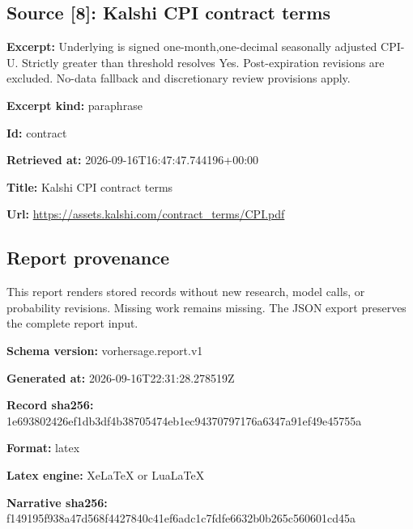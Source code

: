 \documentclass[11pt]{article}
\begin{document}
\subsection*{\textcolor{epdarkgreen}{Source [8]: Kalshi CPI contract terms}}
\par\noindent\textbf{Excerpt:} Underlying is signed one-month,one-decimal seasonally adjusted CPI-U. Strictly greater than threshold resolves Yes. Post-expiration revisions are excluded. No-data fallback and discretionary review provisions apply.

\par\noindent\textbf{Excerpt kind:} paraphrase

\par\noindent\textbf{Id:} contract

\par\noindent\textbf{Retrieved at:} 2026-09-16T1\hspace{0pt}6:47:47.7441\hspace{0pt}96+00:00

\par\noindent\textbf{Title:} Kalshi CPI contract terms

\par\noindent\textbf{Url:} \href{https://assets.kalshi.com/contract\_terms/CPI.pdf}{https://asse\hspace{0pt}ts.kalshi.co\hspace{0pt}m/contract\_t\hspace{0pt}erms/CPI.pdf}

\subsection*{\textcolor{epdarkgreen}{Report provenance}}
This report renders stored records without new research, model calls, or probability revisions. Missing work remains missing. The JSON export preserves the complete report input.


\par\noindent\textbf{Schema version:} vorhersage.report.v1

\par\noindent\textbf{Generated at:} 2026-09-16T22:31:28.278519Z

\par\noindent\textbf{Record sha256:} 1e693802426e\hspace{0pt}f1db3df4b387\hspace{0pt}05474eb1ec94\hspace{0pt}370797176a63\hspace{0pt}47a91ef49e45\hspace{0pt}755a

\par\noindent\textbf{Format:} latex

\par\noindent\textbf{Latex engine:} XeLaTeX or LuaLaTeX

\par\noindent\textbf{Narrative sha256:} f149195f938a\hspace{0pt}47d568f44278\hspace{0pt}40c41ef6adc1\hspace{0pt}c7fdfe6632b0\hspace{0pt}b265c560601c\hspace{0pt}d45a
\end{document}
